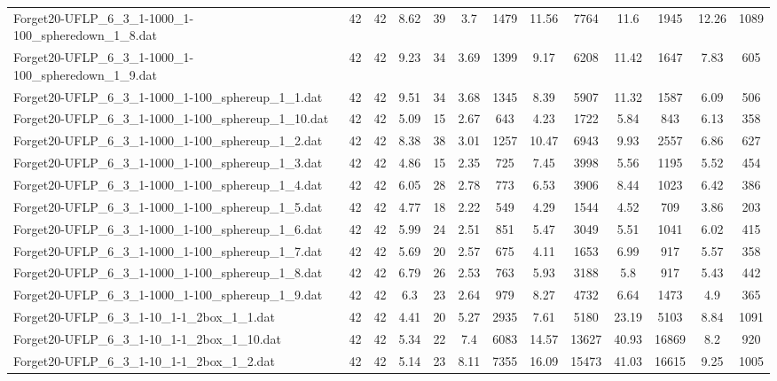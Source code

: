 \begin{table}[!ht]
{\begin{tabular}{lcccccccccccc}
Forget20-UFLP\_6\_3\_1-1000\_1-100\_spheredown\_1\_8.dat & 42 & 42 & 8.62 & 39 & 3.7 & 1479 & 11.56 & 7764 & 11.6 & 1945 & 12.26 & 1089 \\
Forget20-UFLP\_6\_3\_1-1000\_1-100\_spheredown\_1\_9.dat & 42 & 42 & 9.23 & 34 & 3.69 & 1399 & 9.17 & 6208 & 11.42 & 1647 & 7.83 & 605 \\
Forget20-UFLP\_6\_3\_1-1000\_1-100\_sphereup\_1\_1.dat & 42 & 42 & 9.51 & 34 & 3.68 & 1345 & 8.39 & 5907 & 11.32 & 1587 & 6.09 & 506 \\
Forget20-UFLP\_6\_3\_1-1000\_1-100\_sphereup\_1\_10.dat & 42 & 42 & 5.09 & 15 & 2.67 & 643 & 4.23 & 1722 & 5.84 & 843 & 6.13 & 358 \\
Forget20-UFLP\_6\_3\_1-1000\_1-100\_sphereup\_1\_2.dat & 42 & 42 & 8.38 & 38 & 3.01 & 1257 & 10.47 & 6943 & 9.93 & 2557 & 6.86 & 627 \\
Forget20-UFLP\_6\_3\_1-1000\_1-100\_sphereup\_1\_3.dat & 42 & 42 & 4.86 & 15 & 2.35 & 725 & 7.45 & 3998 & 5.56 & 1195 & 5.52 & 454 \\
Forget20-UFLP\_6\_3\_1-1000\_1-100\_sphereup\_1\_4.dat & 42 & 42 & 6.05 & 28 & 2.78 & 773 & 6.53 & 3906 & 8.44 & 1023 & 6.42 & 386 \\
Forget20-UFLP\_6\_3\_1-1000\_1-100\_sphereup\_1\_5.dat & 42 & 42 & 4.77 & 18 & 2.22 & 549 & 4.29 & 1544 & 4.52 & 709 & 3.86 & 203 \\
Forget20-UFLP\_6\_3\_1-1000\_1-100\_sphereup\_1\_6.dat & 42 & 42 & 5.99 & 24 & 2.51 & 851 & 5.47 & 3049 & 5.51 & 1041 & 6.02 & 415 \\
Forget20-UFLP\_6\_3\_1-1000\_1-100\_sphereup\_1\_7.dat & 42 & 42 & 5.69 & 20 & 2.57 & 675 & 4.11 & 1653 & 6.99 & 917 & 5.57 & 358 \\
Forget20-UFLP\_6\_3\_1-1000\_1-100\_sphereup\_1\_8.dat & 42 & 42 & 6.79 & 26 & 2.53 & 763 & 5.93 & 3188 & 5.8 & 917 & 5.43 & 442 \\
Forget20-UFLP\_6\_3\_1-1000\_1-100\_sphereup\_1\_9.dat & 42 & 42 & 6.3 & 23 & 2.64 & 979 & 8.27 & 4732 & 6.64 & 1473 & 4.9 & 365 \\
Forget20-UFLP\_6\_3\_1-10\_1-1\_2box\_1\_1.dat & 42 & 42 & 4.41 & 20 & 5.27 & 2935 & 7.61 & 5180 & 23.19 & 5103 & 8.84 & 1091 \\
Forget20-UFLP\_6\_3\_1-10\_1-1\_2box\_1\_10.dat & 42 & 42 & 5.34 & 22 & 7.4 & 6083 & 14.57 & 13627 & 40.93 & 16869 & 8.2 & 920 \\
Forget20-UFLP\_6\_3\_1-10\_1-1\_2box\_1\_2.dat & 42 & 42 & 5.14 & 23 & 8.11 & 7355 & 16.09 & 15473 & 41.03 & 16615 & 9.25 & 1005 \\

\end{tabular}}
\end{table}
